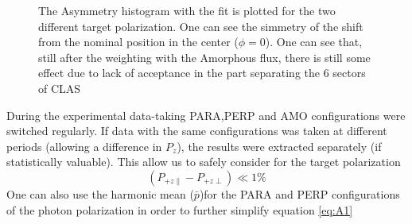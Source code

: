 \begin{figure}[htb]
  \begin{center}
    \caption{The Asymmetry histogram with the fit is plotted for the two different target polarization. One can see the simmetry of the shift from the nominal position in the center ($\phi = 0$).  One can see that, still after the weighting with the Amorphous flux, there is still some effect due to lack of acceptance in the part separating the 6 sectors of CLAS}
    \label{fig:GTgpol}
  \end{center}
\end{figure} 
During the experimental data-taking PARA,PERP and AMO configurations were switched regularly. If data with the same configurations was taken at different periods (allowing a difference in $P_z$), the results were extracted separately (if statistically valuable). This allow us to safely consider for the target polarization
\begin{equation}
  (P_{+z\parallel}-P_{+z\perp}) \ll 1 \% 
\end{equation}
One can also use the harmonic mean ($\bar{p}$)for the PARA and PERP configurations of the photon polarization in order to further simplify equation \ref{eq:A1} 
